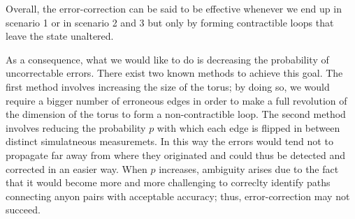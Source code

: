 \documentclass{Configuration_Files/PoliMi3i_thesis}
\begin{document}
Overall, the error-correction can be said to be effective whenever we end up in scenario 1 or in scenario 2 and 3 but only by forming contractible loops that leave the state unaltered. \newline

As a consequence, what we would like to do is decreasing the probability of uncorrectable errors. There exist two known methods to achieve this goal. The first method involves increasing the size of the torus; by doing so, we would require a bigger number of erroneous edges in order to make a full revolution of the dimension of the torus to form a non-contractible loop. \newline 
The second method involves reducing the probability $p$ with which each edge is flipped in between distinct simulatneous measuremets. In this way the errors would tend not to propagate far away from where they originated and could thus be detected and corrected in an easier way. When $p$ increases, ambiguity arises due to the fact that it would become more and more challenging to correclty identify paths connecting anyon pairs with acceptable accuracy; thus, error-correction may not succeed. \newline
\newline
\end{document}
